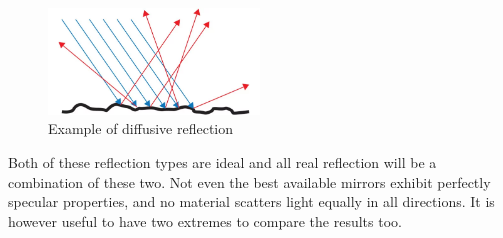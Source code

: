 \begin{figure}[h!]
    \centering
    \includegraphics[width=0.5\textwidth]{figures/theory/Diffuse-Reflection.png}
    \caption{Example of diffusive reflection \cite{DiffuseReflectionOcean}}
    \label{fig:diffusive_reflection}
\end{figure}

Both of these reflection types are ideal and all real reflection will be a combination of these two. Not even the best available mirrors exhibit perfectly specular properties, and no material scatters light equally in all directions. It is however useful to have two extremes to compare the results too. 



% 